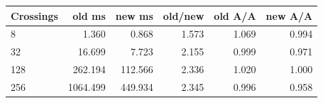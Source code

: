 \begin{center}\small
\begin{tabular}{@{}lrrrrr@{}}
\toprule
Crossings & old ms & new ms & old/new & old A/A & new A/A \\
\midrule
8 & 1.360 & 0.868 & 1.573 & 1.069 & 0.994 \\
32 & 16.699 & 7.723 & 2.155 & 0.999 & 0.971 \\
128 & 262.194 & 112.566 & 2.336 & 1.020 & 1.000 \\
256 & 1064.499 & 449.934 & 2.345 & 0.996 & 0.958 \\
\bottomrule
\end{tabular}
\end{center}
